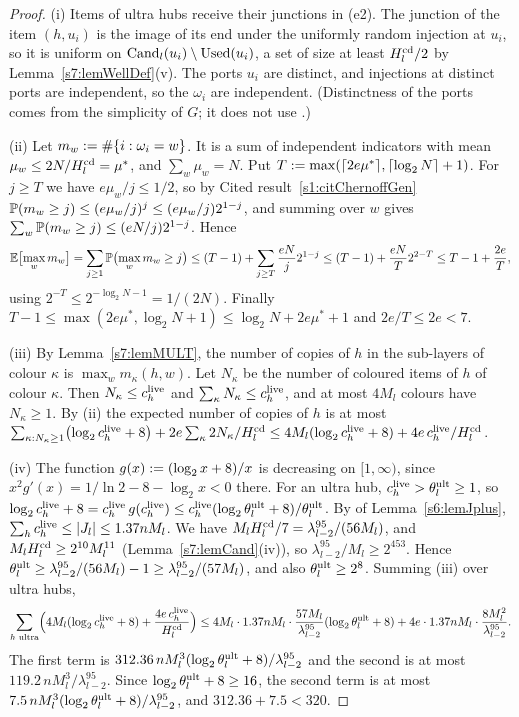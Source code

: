 \begin{proof}
(i) Items of ultra hubs receive their junctions in (e2). The junction of the
item $(h,u_i)$ is the image of its end under the uniformly random injection at
$u_i$, so it is uniform on $\mathrm{Cand}_l(u_i)\setminus\mathrm{Used}(u_i)$, a set of size at
least $H^{\mathrm{cd}}_l/2$ by Lemma~\ref{s7:lemWellDef}(v). The ports $u_i$ are distinct,
and injections at distinct ports are independent, so the $\omega_i$ are
independent. (Distinctness of the ports comes from the simplicity of $G$; it
does not use .)

(ii) Let $m_w\mathrel{:=}\#\{i:\omega_i=w\}$. It is a sum of independent indicators
with mean $\mu_w\le2N/H^{\mathrm{cd}}_l=\mu^*$, and $\sum_w\mu_w=N$. Put
$T\mathrel{:=}\max(\lceil2e\mu^*\rceil,\lceil\log_2N\rceil+1)$. For $j\ge T$ we have
$e\mu_w/j\le1/2$, so by Cited result~\ref{s1:citChernoffGen}
$\mathbb{P}(m_w\ge j)\le(e\mu_w/j)^j\le(e\mu_w/j)2^{1-j}$, and summing over $w$ gives
$\sum_w\mathbb{P}(m_w\ge j)\le(eN/j)2^{1-j}$. Hence
\[
\mathbb{E}\bigl[\max_wm_w\bigr]=\sum_{j\ge1}\mathbb{P}\bigl(\max_wm_w\ge j\bigr)
\le(T-1)+\sum_{j\ge T}\frac{eN}{j}2^{1-j}\le(T-1)+\frac{eN}{T}2^{2-T}
\le T-1+\frac{2e}{T},
\]
using $2^{-T}\le2^{-\log_2N-1}=1/(2N)$. Finally
$T-1\le\max(2e\mu^*,\log_2N+1)\le\log_2N+2e\mu^*+1$ and $2e/T\le2e<7$.

(iii) By Lemma~\ref{s7:lemMULT}, the number of copies of $h$ in the sub-layers of
colour $\kappa$ is $\max_wm_\kappa(h,w)$. Let $N_\kappa$ be the number of
coloured items of $h$ of colour $\kappa$. Then $N_\kappa\le c^{\mathrm{live}}_h$ and
$\sum_\kappa N_\kappa\le c^{\mathrm{live}}_h$, and at most $4M_l$ colours have
$N_\kappa\ge1$. By (ii) the expected number of copies of $h$ is at most
$\sum_{\kappa:N_\kappa\ge1}\bigl(\log_2c^{\mathrm{live}}_h+8\bigr)+2e\sum_\kappa2N_\kappa/H^{\mathrm{cd}}_l
\le4M_l(\log_2c^{\mathrm{live}}_h+8)+4e\,c^{\mathrm{live}}_h/H^{\mathrm{cd}}_l$.

(iv) The function $g(x)\mathrel{:=}(\log_2x+8)/x$ is decreasing on $[1,\infty)$, since
$x^2g'(x)=1/\ln2-8-\log_2x<0$ there. For an ultra hub, $c^{\mathrm{live}}_h>\theta^{\mathrm{ult}}_l\ge1$,
so $\log_2c^{\mathrm{live}}_h+8=c^{\mathrm{live}}_h\,g(c^{\mathrm{live}}_h)\le c^{\mathrm{live}}_h(\log_2\theta^{\mathrm{ult}}_l+8)/\theta^{\mathrm{ult}}_l$.
By  of Lemma~\ref{s6:lemJplus},
$\sum_hc^{\mathrm{live}}_h\le|J_l|\le1.37nM_l$. We have
$M_lH^{\mathrm{cd}}_l/7=\lambda_{l-2}^{95}/(56M_l)$, and $M_lH^{\mathrm{cd}}_l\ge2^{10}M_l^{11}$
(Lemma~\ref{s7:lemCand}(iv)), so $\lambda_{l-2}^{95}/M_l\ge2^{453}$. Hence
$\theta^{\mathrm{ult}}_l\ge\lambda_{l-2}^{95}/(56M_l)-1\ge\lambda_{l-2}^{95}/(57M_l)$, and also
$\theta^{\mathrm{ult}}_l\ge2^{8}$. Summing (iii) over ultra hubs,
\[
\sum_{h\text{ ultra}}\Bigl(4M_l(\log_2c^{\mathrm{live}}_h+8)+\frac{4e\,c^{\mathrm{live}}_h}{H^{\mathrm{cd}}_l}\Bigr)
\le4M_l\cdot1.37nM_l\cdot\frac{57M_l}{\lambda_{l-2}^{95}}(\log_2\theta^{\mathrm{ult}}_l+8)
+4e\cdot1.37nM_l\cdot\frac{8M_l^2}{\lambda_{l-2}^{95}} .
\]
The first term is $312.36\,nM_l^3(\log_2\theta^{\mathrm{ult}}_l+8)/\lambda_{l-2}^{95}$ and the
second is at most $119.2\,nM_l^3/\lambda_{l-2}^{95}$. Since
$\log_2\theta^{\mathrm{ult}}_l+8\ge16$, the second term is at most
$7.5\,nM_l^3(\log_2\theta^{\mathrm{ult}}_l+8)/\lambda_{l-2}^{95}$, and $312.36+7.5<320$.
\end{proof}

